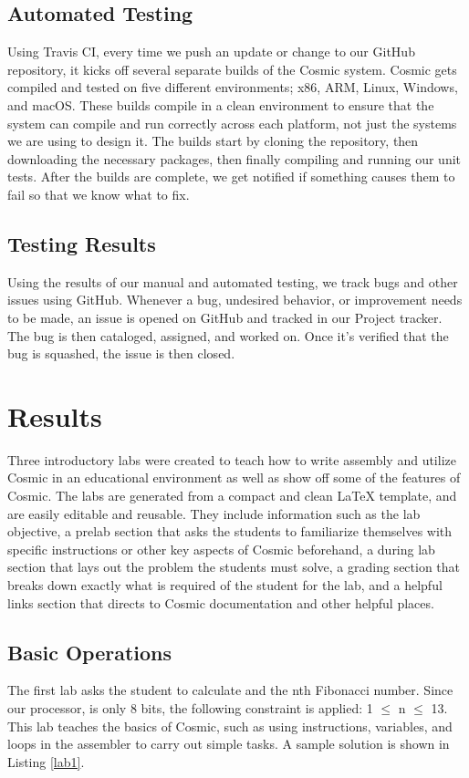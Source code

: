 \documentclass[conference]{IEEEtran}
\begin{document}
\subsection{Automated Testing}
Using Travis CI, every time we push an update or change to our GitHub repository, it kicks off several separate builds of the Cosmic system. Cosmic gets compiled and tested on five different environments; x86, ARM, Linux, Windows, and macOS. These builds compile in a clean environment to ensure that the system can compile and run correctly across each platform, not just the systems we are using to design it. The builds start by cloning the repository, then downloading the necessary packages, then finally compiling and running our unit tests. After the builds are complete, we get notified if something causes them to fail so that we know what to fix.

\subsection{Testing Results}
Using the results of our manual and automated testing, we track bugs and other issues using GitHub. Whenever a bug, undesired behavior, or improvement needs to be made, an issue is opened on GitHub and tracked in our Project tracker. The bug is then cataloged, assigned, and worked on. Once it's verified that the bug is squashed, the issue is then closed.


\section{Results}
Three introductory labs were created to teach how to write assembly and utilize Cosmic in an educational environment as well as show off some of the features of Cosmic. The labs are generated from a compact and clean LaTeX template, and are easily editable and reusable. They include information such as the lab objective, a prelab section that asks the students to familiarize themselves with specific instructions or other key aspects of Cosmic beforehand, a during lab section that lays out the problem the students must solve, a grading section that breaks down exactly what is required of the student for the lab, and a helpful links section that directs to Cosmic documentation and other helpful places.

\subsection{Basic Operations}
The first lab asks the student to calculate and the nth Fibonacci number. Since our processor, is only 8 bits, the following constraint is applied: 1 $\leq$ n $\leq$ 13. This lab teaches the basics of Cosmic, such as using instructions, variables, and loops in the assembler to carry out simple tasks. A sample solution is shown in Listing \ref{lab1}.
\end{document}

